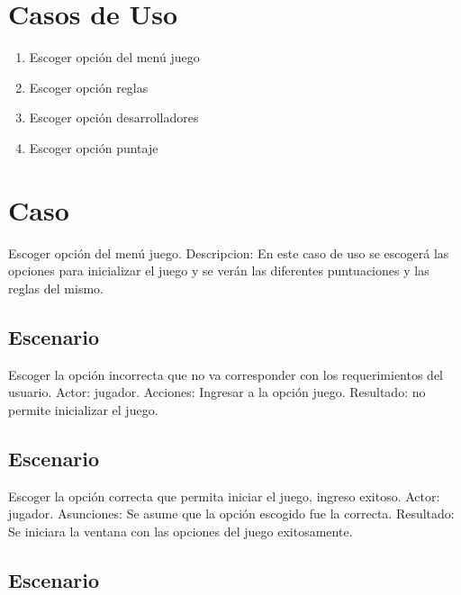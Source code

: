 \section{Casos de Uso}


\begin{enumerate}
	\item {Escoger opción del menú juego}
	\item {Escoger opción reglas}	
	\item{Escoger opción desarrolladores}
	\item{Escoger opción puntaje}
\end{enumerate}

\section{Caso}Escoger  opción del menú juego.\newline\newline
Descripcion: En este caso de uso se escogerá las opciones para inicializar el juego y se verán  las diferentes  puntuaciones y las reglas del mismo.

	\subsection{Escenario}
	 Escoger la opción incorrecta que no va corresponder con los requerimientos del usuario.\newline \newline
Actor: jugador.\newline
Acciones: Ingresar a la opción juego.\newline
Resultado: no permite inicializar el juego.\newline

\subsection{Escenario}
Escoger la opción correcta que permita iniciar el  juego, ingreso exitoso.\newline\newline
Actor: jugador.\newline
Asunciones:  Se asume  que la opción escogido fue la correcta.\newline
Resultado: Se iniciara la ventana con las opciones del juego exitosamente.
 
\subsection{Escenario}
 
